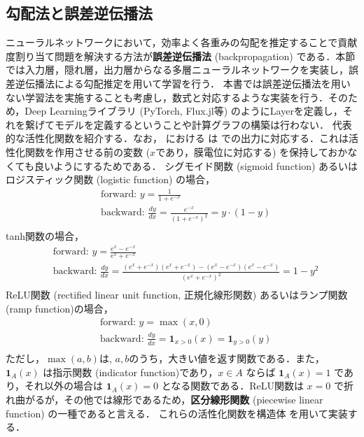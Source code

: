 \subsection{勾配法と誤差逆伝播法}
ニューラルネットワークにおいて，効率よく各重みの勾配を推定することで貢献度割り当て問題を解決する方法が\textbf{誤差逆伝播法} (backpropagation) である．本節では入力層，隠れ層，出力層からなる多層ニューラルネットワークを実装し，誤差逆伝播法による勾配推定を用いて学習を行う．
本書では誤差逆伝播法を用いない学習法を実施することも考慮し，数式と対応するような実装を行う．そのため，Deep Learningライブラリ (PyTorch, Flux.jl等) のようにLayerを定義し，それを繋げてモデルを定義するということや計算グラフの構築は行わない．
代表的な活性化関数を紹介する．なお， における  は  での出力に対応する．これは活性化関数を作用させる前の変数 ($x$であり，膜電位に対応する) を保持しておかなくても良いようにするためである．
シグモイド関数 (sigmoid function) あるいはロジスティック関数 (logistic function) の場合，
\begin{align}
&\textrm{forward: } y = \frac{1}{1+e^{-x}}\\
&\textrm{backward: } \frac{dy}{dx} =\frac{e^{-x}}{(1+e^{-x})^2}= y\cdot (1-y)\\
\end{align}
tanh関数の場合，
\begin{align}
&\textrm{forward: } y = \frac{e^x-e^{-x}}{e^x+e^{-x}}\\
&\textrm{backward: } \frac{dy}{dx} =\frac{(e^x+e^{-x})(e^x+e^{-x})-(e^x-e^{-x})(e^x-e^{-x})}{(e^x+e^{-x})^2}= 1-y^2\\
\end{align}
ReLU関数 (rectified linear unit function, 正規化線形関数) あるいはランプ関数 (ramp function)の場合，
\begin{align}
&\textrm{forward: } y = \max(x, 0)\\
&\textrm{backward: } \frac{dy}{dx} = \mathbf{1}_{x > 0}(x) = \mathbf{1}_{y > 0}(y)\\
\end{align}
ただし，$\max(a, b)$は, $a, b$のうち，大きい値を返す関数である．また，$\mathbf{1}_{A}(x)$ は指示関数 (indicator function)であり，$x\in A$ ならば $\mathbf{1}_A(x)=1$ であり，それ以外の場合は $\mathbf{1}_A(x)=0$ となる関数である．ReLU関数は $x=0$ で折れ曲がるが，その他では線形であるため，\textbf{区分線形関数} (piecewise linear function) の一種であると言える．
これらの活性化関数を構造体 を用いて実装する．
